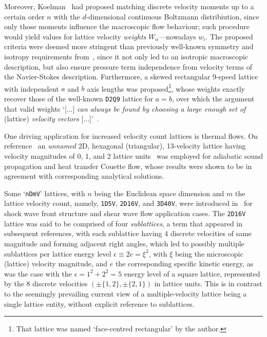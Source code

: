     Moreover, Koelman~\cite{1991-KoelmanJMVA-EurophysLett} had proposed matching discrete velocity moments up to a certain order
    $n$ with the $d$-dimensional continuous Boltzmann distribiution, since only those moments  influence  the  macroscopic  flow
    behaviour; such procedure would yield values for lattice velocity \emph{weights} $W_{\alpha}$---nowadays $w_i$. The proposed
    criteria   were   deemed   more   stringent   than   previously    well-known    symmetry    and    isotropy    requirements
    from~\cite{1986-WolframS-JStatPhys}, since it not only led to an isotropic macroscopic description, but also ensure pressure
    term independence from velocity terms of the Navier-Stokes description. Furthermore, a skewed  rectangular  9-speed  lattice
    with independent $a$ and $b$ axis lengths was proposed\footnote{That lattice was named  `face-centred  rectangular'  by  the
    author.}, whose weights exactly recover those of the well-known \texttt{D2Q9} lattice for $a = b$, over which  the  argument
    that valid weights `[...] \emph{can always be found by choosing a large enough set of} (lattice)  \emph{velocity  vectors\/}
    [...]'~\cite{1991-KoelmanJMVA-EurophysLett}.

    One    driving    application     for     increased     velocity     count     lattices     is     thermal     flows.     On
    reference~\cite{1993-AlexanderFJ+SterlingJD-PhysRevE} an \emph{unnamed}  2D,  hexagonal  (triangular),  13-velocity  lattice
    having velocity magnitudes of 0,  1,  and  2  lattice  units~\cite{1998-ChenS+DoolenGD-AnnuRevFluidMech}  was  employed  for
    adiabatic sound propagation and heat transfer Couette flow, whose results were shown to be in agreement  with  corresponding
    analytical solutions.

    Some `\texttt{nDmV}' lattices, with $n$ being the Euclidean space dimension and $m$  the  lattice  velocity  count,  namely,
    \texttt{1D5V}, \texttt{2D16V}, and \texttt{3D40V}, were introduced  in~\cite{1994-ChenY+AkiyamaM-PhysRevE}  for  shock  wave
    front structure and shear wave flow application cases.  The  \texttt{2D16V}  lattice  was  said  to  be  comprised  of  four
    \emph{sublattices}, a term that appeared in subsequent references, with each sublattice having 4 discrete velocities of same
    magnitude and forming adjacent right angles, which led to possibly multiple sublattices per lattice energy  level  $\epsilon
    \equiv 2e = \xi^2$, with $\xi$ being the microscopic (lattice)  velocity  magnitude,  and  $e$  the  corresponding  specific
    kinetic energy, as was the case with the $\epsilon = 1^2 + 2^2 = 5$ energy level of a square lattice, represented by  the  8
    discrete velocities $(\pm\{1,2\},\pm\{2,1\})$ in lattice units. This is in contrast to the seemingly prevailing current view
    of a multiple-velocity lattice being a single lattice entity, without explicit reference to sublattices.

